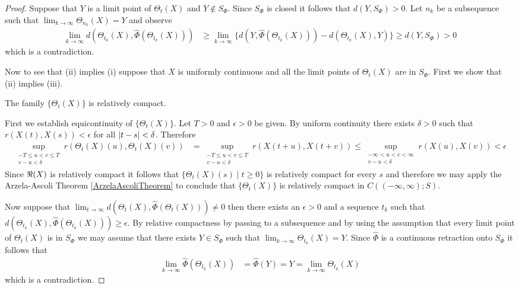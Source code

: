 \begin{proof}
Suppose that $Y$ is a limit point of $\Theta_t(X)$ and $Y \notin S_\Phi$.  Since $S_\Phi$ is closed it follows that $d(Y, S_\Phi) > 0$.  Let $n_k$ be a subsequence such that $\lim_{k \to \infty} \Theta_{n_k}(X) = Y$ and observe
\begin{align*}
\lim_{k \to \infty} d(\Theta_{t_k}(X), \hat{\Phi}(\Theta_{t_k}(X))) &\geq \lim_{k \to \infty} \lbrace d(Y, \hat{\Phi}(\Theta_{t_k}(X))) - d(\Theta_{t_k}(X),Y)\rbrace \geq d(Y, S_\Phi) > 0
\end{align*}
which is a contradiction.

Now to see that (ii) implies (i) suppose that $X$ is uniformly continuous and all the limit points of $\Theta_t(X)$ are in $S_\Phi$.  First we show that (ii) implies (iii).
\begin{clm}The family $\lbrace \Theta_t(X) \rbrace$ is relatively compact.
\end{clm}
First we establish equicontinuity of $\lbrace \Theta_t(X) \rbrace$.  Let $T > 0$ and $\epsilon > 0$ be given.  By uniform continuity there exists $\delta > 0$ such that $r(X(t), X(s)) < \epsilon$ for all $\left \vert t-s \right \vert<\delta$. Therefore
\begin{align*}
\sup_{\substack{-T \leq u<v \leq T \\ v-u<\delta}} r(\Theta_t(X)(u), \Theta_t(X)(v)) &= \sup_{\substack{-T \leq u<v \leq T \\ v-u<\delta}} r(X(t+u), X(t+v)) \leq \sup_{\substack{-\infty <  u<v <\infty\\ v-u<\delta}} r(X(u), X(v)) < \epsilon
\end{align*}
Since $\Re(X)$ is relatively compact it follows that $\lbrace \Theta_t(X)(s) \mid t \geq 0 \rbrace$ is relatively compact for every $s$ and therefore we may apply the Arzela-Ascoli Theorem \ref{ArzelaAscoliTheorem} to conclude that $\lbrace \Theta_t(X) \rbrace$ is relatively compact in $C((-\infty,\infty); S)$.  

Now suppose that $\lim_{t \to \infty} d(\Theta_t(X), \hat{\Phi}(\Theta_t(X))) \neq 0$ then there exists an $\epsilon > 0$ and a sequence $t_k$ such that $d(\Theta_{t_k}(X), \hat{\Phi}(\Theta_{t_k}(X))) \geq \epsilon$.  By relative compactness by passing to a subsequence and by using the assumption that every limit point of $\Theta_t(X)$ is in $S_\Phi$  we may assume that there exists $Y \in S_\Phi$ such that $\lim_{k \to \infty} \Theta_{t_k}(X) = Y$.  Since $\hat{\Phi}$ is a continuous retraction onto $S_\Phi$ it follows that 
\begin{align*}
\lim_{k \to \infty} \hat{\Phi}(\Theta_{t_k}(X)) &= \hat{\Phi}( Y) = Y = \lim_{k \to \infty} \Theta_{t_k}(X) 
\end{align*}
which is a contradiction.
\end{proof}

